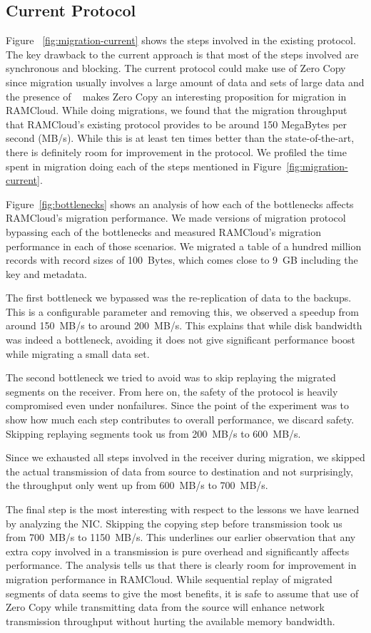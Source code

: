 \subsection{Current Protocol}
Figure ~\ref{fig:migration-current} shows the steps involved in the existing protocol. The key drawback to the current approach is that 
most of the steps involved are synchronous and blocking. The current protocol could make use of Zero Copy since migration usually involves a 
large amount of data and sets of large data and the presence of ~\cite{ramcloudtx} makes Zero Copy an interesting proposition 
for migration in RAMCloud. While doing migrations, we found that the migration throughput that RAMCloud's existing protocol provides to 
be around 150 MegaBytes per second (MB/s). While this is at least ten times better than the state-of-the-art, there is definitely room for improvement in the protocol.
We profiled the time spent in migration doing each of the steps mentioned in Figure~\ref{fig:migration-current}.

Figure~\ref{fig:bottlenecks} shows an analysis of how each of the bottlenecks affects RAMCloud's migration performance. We made versions of migration 
protocol bypassing each of the bottlenecks and measured RAMCloud's migration performance in each of those scenarios. We migrated a table of a hundred million 
records with record sizes of 100~Bytes, which comes close to 9~GB including the key and metadata.

The first bottleneck we bypassed was the re-replication of data to the backups. This is a configurable parameter and removing this, we observed a speedup from around 150~MB/s to around 
200~MB/s. This explains that while disk bandwidth was indeed a bottleneck, avoiding it does not give significant performance boost while migrating a small data set.

The second bottleneck we tried to avoid was to skip replaying the migrated segments on the receiver. From here on, the safety of the protocol is heavily compromised even under 
 nonfailures. Since the point of the experiment was to show how much each step contributes to overall performance, we discard safety. Skipping replaying segments took us from 
 200~MB/s to 600~MB/s. 

Since we exhausted all steps involved in the receiver during migration, we skipped the actual transmission of data from source to destination and not surprisingly, the throughput 
only went up from 600~MB/s to 700~MB/s. 

The final step is the most interesting with respect to the lessons we have learned by analyzing the NIC. Skipping the copying step before transmission took us from 700~MB/s to 
1150~MB/s. This underlines our earlier observation that any extra copy involved in a transmission is pure overhead and significantly affects performance. 
The analysis tells us that there is clearly room for improvement in migration performance in RAMCloud. While sequential replay of migrated segments of data seems to give the most benefits, 
it is safe to assume that use of Zero Copy while transmitting data from the source will enhance network transmission throughput without hurting the available memory bandwidth.

